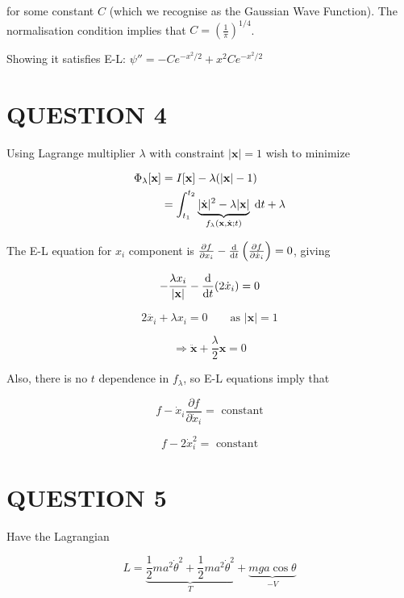 \documentclass[a4paper]{article}
\begin{document}
for some constant $ C $ (which we recognise as the Gaussian Wave Function).
The normalisation condition implies that $ C = \left(  \frac{1}{\pi} \right)^{1/4}  $. 

Showing it satisfies E-L: $ \psi'' = -C e^{-x^{2}/2}  + x^{2} C e^{-x^{2}/2} $





\section{QUESTION 4}
                                                 
Using Lagrange multiplier $ \lambda $ with constraint $ | \mathbf{x} | = 1 $ wish to minimize
                                                 
\begin{align*}
\Phi_{\lambda}[\mathbf{x}] & = I[\mathbf{x}] - \lambda(  | \mathbf{x} | - 1 ) \\
& = \int_{t_{1}}^{t_{2}} \underbrace{| \dot{\mathbf{x}} |^{2} - \lambda | \mathbf{x} |}_{f_{\lambda}(\mathbf{x},\dot{\mathbf{x}} ; t )  } \; \mathrm{d} t + \lambda
\end{align*}   

The E-L equation for $ x_{i} $ component is $ \frac{\partial f }{\partial x_{i}} - \frac{\mathrm{d} }{\mathrm{d} t} \left(  \frac{\partial f}{\partial \dot{x}_{i}} \right) = 0   $, giving

\[ - \frac{\lambda x_{i}}{| \mathbf{x} |}  - \frac{\mathrm{d} }{\mathrm{d} t} (  2 \dot{x}_{i} ) = 0 \]     

\[ 2 \ddot{x_{i}} + \lambda x_{i} = 0  \qquad \text{as } | \mathbf{x} | = 1 \]        

\[ \Rightarrow \ddot{\mathbf{x}}  + \frac{\lambda}{2} \mathbf{x} = 0 \]    

Also, there is no $ t $ dependence in $ f_{\lambda} $, so E-L equations imply that

\[ f - \dot{x}_{i} \frac{\partial f }{\partial \dot{x}_{i}} = \text{ constant} \]    

\[ f - 2  \dot{x}_{i}^{2} = \text{ constant} \]                         




\section{QUESTION 5}


Have the Lagrangian

\[ L = \underbrace{\frac{1}{2} m a^{2} \dot{\theta}^{2}  + \frac{1}{2} m a^{2} \dot{\theta}^{2}  }_{T} + \underbrace{mga \cos \theta}_{- V} \]
\end{document}
